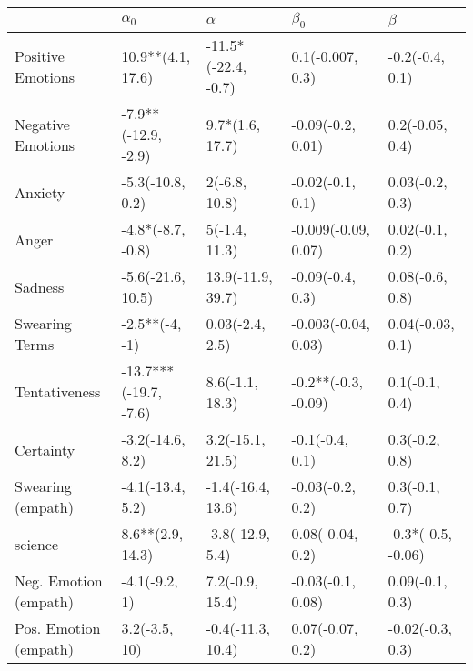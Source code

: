 \begin{tabular}{lllll}
\toprule
{} &             $\alpha_0$ &             $\alpha$ &            $\beta_0$ &             $\beta$ \\
\midrule
Positive Emotions     &      10.9**(4.1, 17.6) &  -11.5*(-22.4, -0.7) &     0.1(-0.007, 0.3) &     -0.2(-0.4, 0.1) \\
Negative Emotions     &    -7.9**(-12.9, -2.9) &      9.7*(1.6, 17.7) &    -0.09(-0.2, 0.01) &     0.2(-0.05, 0.4) \\
Anxiety               &       -5.3(-10.8, 0.2) &        2(-6.8, 10.8) &     -0.02(-0.1, 0.1) &     0.03(-0.2, 0.3) \\
Anger                 &      -4.8*(-8.7, -0.8) &        5(-1.4, 11.3) &  -0.009(-0.09, 0.07) &     0.02(-0.1, 0.2) \\
Sadness               &      -5.6(-21.6, 10.5) &    13.9(-11.9, 39.7) &     -0.09(-0.4, 0.3) &     0.08(-0.6, 0.8) \\
Swearing Terms        &         -2.5**(-4, -1) &      0.03(-2.4, 2.5) &  -0.003(-0.04, 0.03) &    0.04(-0.03, 0.1) \\
Tentativeness         &  -13.7***(-19.7, -7.6) &      8.6(-1.1, 18.3) &  -0.2**(-0.3, -0.09) &      0.1(-0.1, 0.4) \\
Certainty             &       -3.2(-14.6, 8.2) &     3.2(-15.1, 21.5) &      -0.1(-0.4, 0.1) &      0.3(-0.2, 0.8) \\
Swearing (empath)     &       -4.1(-13.4, 5.2) &    -1.4(-16.4, 13.6) &     -0.03(-0.2, 0.2) &      0.3(-0.1, 0.7) \\
science               &       8.6**(2.9, 14.3) &     -3.8(-12.9, 5.4) &     0.08(-0.04, 0.2) &  -0.3*(-0.5, -0.06) \\
Neg. Emotion (empath) &          -4.1(-9.2, 1) &      7.2(-0.9, 15.4) &    -0.03(-0.1, 0.08) &     0.09(-0.1, 0.3) \\
Pos. Emotion (empath) &          3.2(-3.5, 10) &    -0.4(-11.3, 10.4) &     0.07(-0.07, 0.2) &    -0.02(-0.3, 0.3) \\
\bottomrule
\end{tabular}
